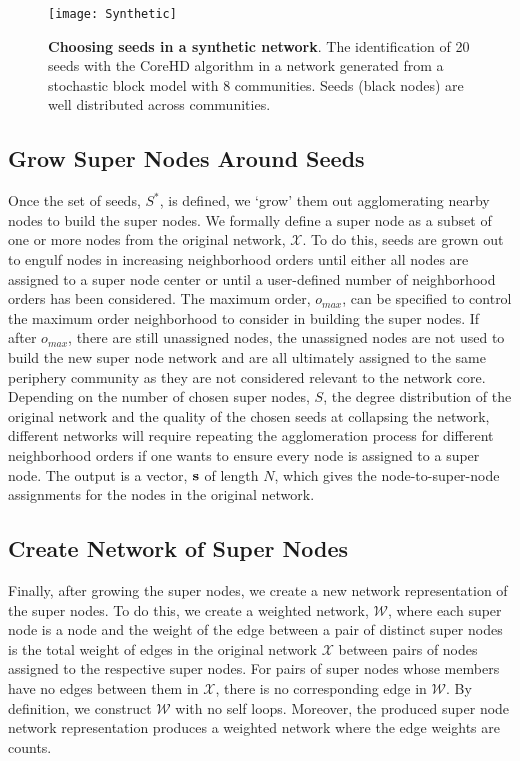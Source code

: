 \begin{figure}
\centering
\texttt{[image: Synthetic]}
\caption{{\bf Choosing seeds in a synthetic network}. The identification of 20 seeds with the CoreHD algorithm in a network generated from a stochastic block model with 8 communities. Seeds (black nodes) are well distributed across communities.}
\label{Synth}
\end{figure}

\subsection{Grow Super Nodes Around Seeds}
Once the set of seeds, $S^{*}$, is defined, we `grow' them out  agglomerating nearby nodes to build the super nodes. We formally define a super node as a subset of one or more nodes from the original network, ${\mathcal X}$. To do this, seeds are grown out to engulf nodes in increasing neighborhood orders until either all nodes are assigned to a super node center or until a user-defined number of neighborhood orders has been considered. The maximum order, $o_{max}$, can be specified to control the maximum order neighborhood to consider in building the super nodes. If after $o_{max}$, there are still unassigned nodes, the unassigned nodes are not used to build the new super node network and are all ultimately assigned to the same periphery community as they are not considered relevant to the network core.  Depending on the number of chosen super nodes, $S$, the degree distribution of the original network and the quality of the chosen seeds at collapsing the network, different networks will require repeating the agglomeration process for different neighborhood orders if one wants to ensure every node is assigned to a super node.  %
The output is a vector, ${\bf s}$ of length $N$, which gives the node-to-super-node assignments for the nodes in the original network. 

\subsection{Create Network of Super Nodes}
Finally, after growing the super nodes, we create a new network representation of the super nodes. To do this, we create a weighted network, $\mathcal{W}$, where each super node is a node and the weight of the edge between a pair of distinct super nodes is the total weight of edges in the original network ${\mathcal X}$ between pairs of nodes assigned to the respective  super nodes. For pairs of super nodes whose members have no edges between them in ${\mathcal X}$, there is no corresponding edge in ${\mathcal W}$. By definition, we construct ${\mathcal W}$ with no self loops. Moreover, the produced super node network representation produces a weighted network where the edge weights are counts. 

